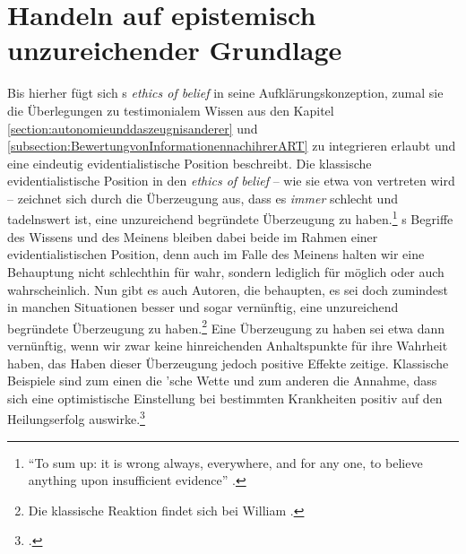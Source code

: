 \section{Handeln auf epistemisch unzureichender
Grundlage}\label{section:HandelnAufEpistemischDuennerGrundlage}
Bis hierher fügt sich s \emph{ethics of belief} in seine
Aufklärungskonzeption, zumal sie die Überlegungen zu testimonialem Wissen aus
den Kapitel \ref{section:autonomieunddaszeugnisanderer} und
\ref{subsection:BewertungvonInformationennachihrerART} zu integrieren erlaubt
und eine eindeutig evidentialistische Position beschreibt.
Die klassische evidentialistische Position in den \emph{ethics of belief} -- wie
sie etwa von  vertreten wird -- zeichnet sich
durch die Überzeugung aus, dass es \emph{immer} schlecht und tadelnswert ist,
eine unzureichend begründete Überzeugung zu
haben.\footnote{\enquote{To sum up: it is wrong always, everywhere, and for any
one, to believe anything upon insufficient evidence}
\parencite[][195]{Clifford:TheEthicsofBelief1877}.} s
Begriffe des Wissens und des Meinens bleiben dabei beide im Rahmen einer
evidentialistischen Position, denn auch im Falle des Meinens halten wir eine
Behauptung nicht schlechthin für wahr, sondern lediglich für möglich oder auch
wahrscheinlich. Nun gibt es auch Autoren, die behaupten, es sei doch zumindest
in manchen Situationen besser und sogar vernünftig, eine unzureichend begründete Überzeugung zu
haben.\footnote{Die klassische Reaktion findet sich bei William
\textcite[vgl.][]{James:TheWilltoBelieve1919}.} Eine Überzeugung zu haben sei
etwa dann vernünftig, wenn wir zwar keine hinreichenden Anhaltspunkte für ihre
Wahrheit haben, das Haben dieser Überzeugung jedoch positive Effekte zeitige.
Klassische Beispiele sind zum einen die 'sche
Wette und zum anderen die Annahme, dass sich eine optimistische Einstellung bei
bestimmten Krankheiten positiv auf den Heilungserfolg
auswirke.\footcite[Vgl.][]{Chignell:TheEthicsofBelief2013}

